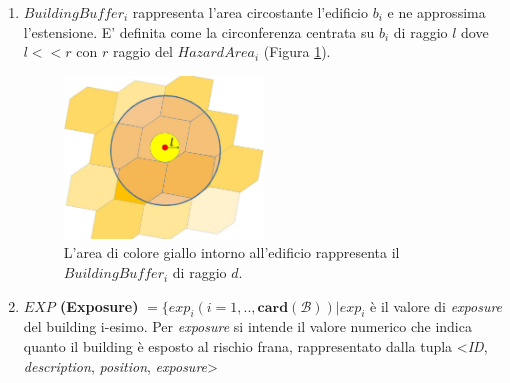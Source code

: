 \begin{enumerate}
	\item \textit{$BuildingBuffer_i$} rappresenta l'area circostante l'edificio $b_i$ e ne approssima l'estensione. E' definita come la circonferenza centrata su $b_i$ di raggio $l$ dove $l<<r $ con $r$ raggio del \textit{$HazardArea_i$} (Figura \ref{buildingimpactfactor}).
	
	\begin{figure}[h]
		\centering
		\includegraphics[width=0.5\textwidth]{images/buildingimpactfactor}
		\caption{L'area di colore giallo intorno all'edificio rappresenta il $BuildingBuffer_i$ di raggio $d$.}
		\label{buildingimpactfactor}
	\end{figure}
	
	\item \label{last_enum} \textbf{$EXP$ (Exposure)} $ = \{exp_i(i=1,..,\mathbf{card}(\mathcal{B})) | exp_i $ è il valore di \textit{exposure} del building i-esimo. Per \textit{exposure} si intende il valore numerico che indica quanto il building è esposto al rischio frana, 
	rappresentato dalla tupla <\textit{ID}, \textit{description}, \textit{position}, \textit{exposure}> 
	
\end{enumerate}
